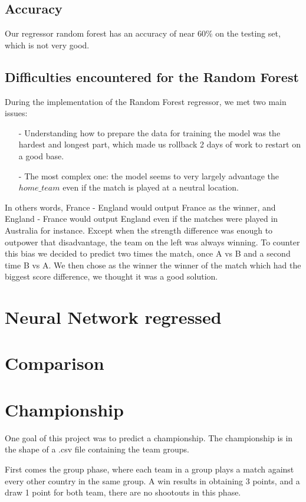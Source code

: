 \subsection{Accuracy}
Our regressor random forest has an accuracy of near 60\% on the testing set, which is not very good.
\subsection{Difficulties encountered for the Random Forest}
During the implementation of the Random Forest regressor, we met two main issues:
 \begin{itemize}
    \item[-] Understanding how to prepare the data for training the model was the hardest and longest part, which made us rollback 2 days of work to restart on a good base.
    \item[-] The most complex one: the model seems to very largely advantage the $home\_team$ even if the match is played at a neutral location.

\end{itemize}
	In others words, France - England would output France as the winner, and England - France would output England even if the matches were played in Australia for instance.
	Except when the strength difference was enough to outpower that disadvantage, the team on the left was always winning.
	To counter this bias we decided to predict two times the match, once A vs B and a second time B vs A. We then chose as the winner the winner of the match which had the biggest score difference, we thought it was a good solution.
\newpage
\section{Neural Network regressed}
\section{Comparison}
\section{Championship}
One goal of this project was to predict a championship.
The championship is in the shape of a .csv file containing the team groups.

First comes the group phase, where each team in a group plays a match against every other country in the same group. A win results in obtaining 3 points, and a draw 1 point for both team, there are no shootouts in this phase.

